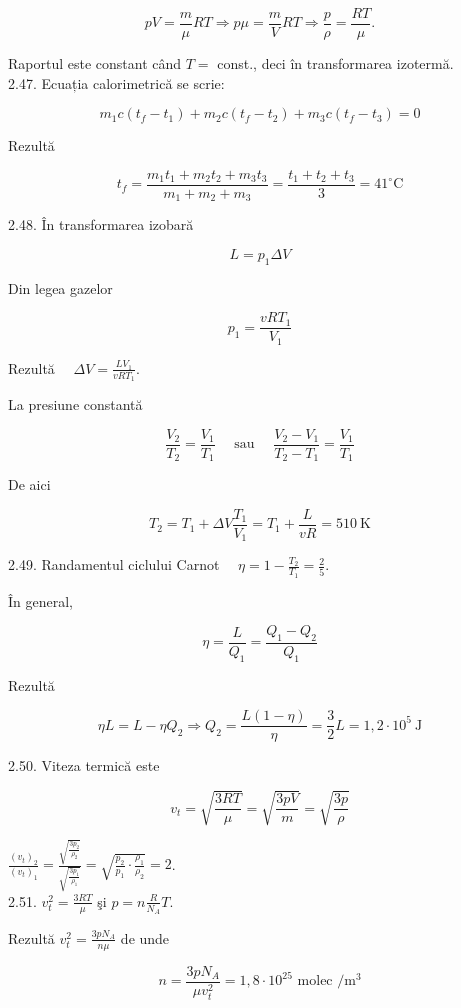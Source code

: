 \documentclass[10pt]{article}
\begin{document}
$$
p V=\frac{m}{\mu} R T \Rightarrow p \mu=\frac{m}{V} R T \Rightarrow \frac{p}{\rho}=\frac{R T}{\mu} .
$$

Raportul este constant când $T=$ const., deci în transformarea izotermă.\\
2.47. Ecuația calorimetrică se scrie:

$$
m_{1} c\left(t_{f}-t_{1}\right)+m_{2} c\left(t_{f}-t_{2}\right)+m_{3} c\left(t_{f}-t_{3}\right)=0
$$

Rezultă

$$
t_{f}=\frac{m_{1} t_{1}+m_{2} t_{2}+m_{3} t_{3}}{m_{1}+m_{2}+m_{3}}=\frac{t_{1}+t_{2}+t_{3}}{3}=41^{\circ} \mathrm{C}
$$

2.48. În transformarea izobară

$$
L=p_{1} \Delta V
$$

Din legea gazelor

$$
p_{1}=\frac{v R T_{1}}{V_{1}}
$$

Rezultă $\quad \Delta V=\frac{L V_{1}}{v R T_{1}}$.

La presiune constantă

$$
\frac{V_{2}}{T_{2}}=\frac{V_{1}}{T_{1}} \quad \text { sau } \quad \frac{V_{2}-V_{1}}{T_{2}-T_{1}}=\frac{V_{1}}{T_{1}}
$$

De aici

$$
T_{2}=T_{1}+\Delta V \frac{T_{1}}{V_{1}}=T_{1}+\frac{L}{v R}=510 \mathrm{~K}
$$

2.49. Randamentul ciclului Carnot $\quad \eta=1-\frac{T_{2}}{T_{1}}=\frac{2}{5}$.

În general,

$$
\eta=\frac{L}{Q_{1}}=\frac{Q_{1}-Q_{2}}{Q_{1}}
$$

Rezultă

$$
\eta L=L-\eta Q_{2} \Rightarrow Q_{2}=\frac{L(1-\eta)}{\eta}=\frac{3}{2} L=1,2 \cdot 10^{5} \mathrm{~J}
$$

2.50. Viteza termică este

$$
v_{t}=\sqrt{\frac{3 R T}{\mu}}=\sqrt{\frac{3 p V}{m}}=\sqrt{\frac{3 p}{\rho}}
$$

$\frac{\left(v_{t}\right)_{2}}{\left(v_{t}\right)_{1}}=\frac{\sqrt{\frac{3 p_{2}}{\rho_{2}}}}{\sqrt{\frac{3 p_{1}}{\rho_{1}}}}=\sqrt{\frac{p_{2}}{p_{1}} \cdot \frac{\rho_{1}}{\rho_{2}}}=2$.\\
2.51. $v_{t}^{2}=\frac{3 R T}{\mu}$ şi $p=n \frac{R}{N_{A}} T$.

Rezultă $v_{t}^{2}=\frac{3 p N_{A}}{n \mu}$ de unde

$$
n=\frac{3 p N_{A}}{\mu v_{t}^{2}}=1,8 \cdot 10^{25} \text { molec } / \mathrm{m}^{3}
$$
\end{document}
